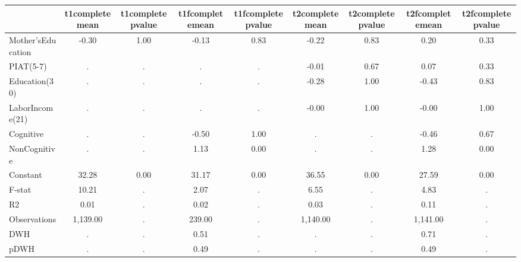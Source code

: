 \begin{table}[htbp]
\begin{tabular}{lcccccccc} \hline \hline
 & t1completemean  & t1completepvalue  & t1fcompletemean  & t1fcompletepvalue  & t2completemean  & t2completepvalue  & t2fcompletemean  & t2fcompletepvalue  \\  \hline 
Mother'sEducation &        -0.30 &         1.00 &        -0.13 &         0.83 &        -0.22 &         0.83 &         0.20 &         0.33 \\  
PIAT(5-7) &            . &            . &            . &            . &        -0.01 &         0.67 &         0.07 &         0.33 \\  
Education(30) &            . &            . &            . &            . &        -0.28 &         1.00 &        -0.43 &         0.83 \\  
LaborIncome(21) &            . &            . &            . &            . &        -0.00 &         1.00 &        -0.00 &         1.00 \\  
Cognitive &            . &            . &        -0.50 &         1.00 &            . &            . &        -0.46 &         0.67 \\  
NonCognitive &            . &            . &         1.13 &         0.00 &            . &            . &         1.28 &         0.00 \\  
Constant &        32.28 &         0.00 &        31.17 &         0.00 &        36.55 &         0.00 &        27.59 &         0.00 \\  
F-stat &        10.21 &            . &         2.07 &            . &         6.55 &            . &         4.83 &            . \\  
R2 &         0.01 &            . &         0.02 &            . &         0.03 &            . &         0.11 &            . \\  
Observations &     1,139.00 &            . &       239.00 &            . &     1,140.00 &            . &     1,141.00 &            . \\  
DWH &            . &            . &         0.51 &            . &            . &            . &         0.71 &            . \\  
pDWH &            . &            . &         0.49 &            . &            . &            . &         0.49 &            . \\  
\hline \hline \end{tabular}
\end{table}
